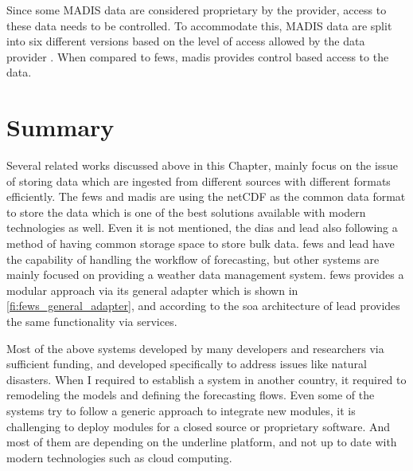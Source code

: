 Since some MADIS data are considered proprietary by the provider, access to these data needs to be controlled. To accommodate this, MADIS data are split into six different versions based on the level of access allowed by the data provider \cite{Macdermaid2005ARCHITECTUREP2.39}. When compared to \acrshort{fews}, \acrshort{madis} provides control based access to the data.



\section{Summary}
\label{se:lit_summary}
Several related works discussed above in this Chapter, mainly focus on the issue of storing data which are ingested from different sources with different formats efficiently. The \acrshort{fews} and \acrshort{madis} are using the \acrshort{netCDF} as the common data format to store the data which is one of the best solutions available with modern technologies as well. Even it is not mentioned, the \acrshort{dias} and \acrshort{lead} also following a method of having common storage space to store bulk data.
\acrshort{fews} and \acrshort{lead} have the capability of handling the workflow of forecasting, but other systems are mainly focused on providing a weather data management system.
\acrshort{fews} provides a modular approach via its general adapter which is shown in \cref{fi:fews_general_adapter}, and according to the \acrshort{soa} architecture of \acrshort{lead} provides the same functionality via services.

Most of the above systems developed by many developers and researchers via sufficient funding, and developed specifically to address issues like natural disasters. When I required to establish a system in another country, it required to remodeling the models and defining the forecasting flows. Even some of the systems try to follow a generic approach to integrate new modules, it is challenging to deploy modules for a closed source or proprietary software. And most of them are depending on the underline platform, and not up to date with modern technologies such as cloud computing.
